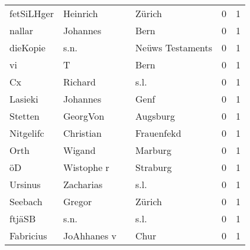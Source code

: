 \begin{tabular}{llllrr}
               fetSiLHger &                           Heinrich &             &                                      Zürich &          0 &         1 \\
                   nallar &                           Johannes &             &                                        Bern &          0 &         1 \\
                 dieKopie &                               s.n. &             &                            Neüws Testaments &          0 &         1 \\
                       vi &                                  T &             &                                        Bern &          0 &         1 \\
                       Cx &                            Richard &             &                                        s.l. &          0 &         1 \\
                  Lasieki &                           Johannes &             &                                        Genf &          0 &         1 \\
                  Stetten &                           GeorgVon &             &                                    Augsburg &          0 &         1 \\
                Nitgelifc &                          Christian &             &                                  Frauenfekd &          0 &         1 \\
                     Orth &                             Wigand &             &                                     Marburg &          0 &         1 \\
                       öD &                         Wistophe r &             &                                    Straburg &          0 &         1 \\
                  Ursinus &                          Zacharias &             &                                        s.l. &          0 &         1 \\
                  Seebach &                             Gregor &             &                                      Zürich &          0 &         1 \\
                   ftjäSB &                               s.n. &             &                                        s.l. &          0 &         1 \\
                Fabricius &                        JoAhhanes v &             &                                        Chur &          0 &         1 \\

\end{tabular}
